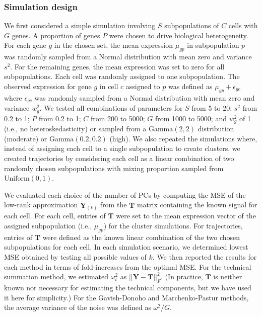 \documentclass[10pt,letterpaper]{article}
\begin{document}
\subsubsection{Simulation design}
We first considered a simple simulation involving $S$ subpopulations of $C$ cells with $G$ genes.
A proportion of genes $P$ were chosen to drive biological heterogeneity.
For each gene $g$ in the chosen set, the mean expression $\mu_{gp}$ in subpopulation $p$ was randomly sampled from a Normal distribution with mean zero and variance $s^2$.
For the remaining genes, the mean expression was set to zero for all subpopulations.
Each cell was randomly assigned to one subpopulation.
The observed expression for gene $g$ in cell $c$ assigned to $p$ was defined as $\mu_{gp} + \epsilon_{gc}$ where $\epsilon_{gc}$ was randomly sampled from a Normal distribution with mean zero and variance $w^2_g$.
We tested all combinations of parameters for $S$ from 5 to 20; $s^2$ from 0.2 to 1; $P$ from 0.2 to 1; $C$ from 200 to 5000; $G$ from 1000 to 5000;
and $w^2_g$ of 1 (i.e., no heteroskedasticity) or sampled from a $\mbox{Gamma}(2,2)$ distribution (moderate) or $\mbox{Gamma}(0.2,0.2)$ (high).
We also repeated the simulations where, instead of assigning each cell to a single subpopulation to create clusters,
we created trajectories by considering each cell as a linear combination of two randomly chosen subpopulations with mixing proportion sampled from $\mbox{Uniform}(0, 1)$.

We evaluated each choice of the number of PCs by computing the MSE of the low-rank approximation $\mathbf{\tilde Y}_{(k)}$ from the $\mathbf{T}$ matrix containing the known signal for each cell.
For each cell, entries of $\mathbf{T}$ were set to the mean expression vector of the assigned subpopulation (i.e., $\mu_{gp}$) for the cluster simulations.
For trajectories, entries of $\mathbf{T}$ were defined as the known linear combination of the two chosen subpopulations for each cell.
In each simulation scenario, we determined lowest MSE obtained by testing all possible values of $k$.
We then reported the results for each method in terms of fold-increases from the optimal MSE.
For the technical summation method, we estimated $\omega^2_t$ as $||\mathbf{Y} - \mathbf{T}||^2_F$.
(In practice, $\mathbf{T}$ is neither known nor necessary for estimating the technical components, but we have used it here for simplicity.)
For the Gavish-Donoho and Marchenko-Pastur methods, the average variance of the noise was defined as $\omega^2/G$.
\end{document}
